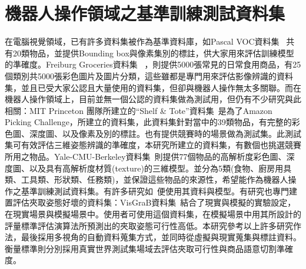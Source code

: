 \section{機器人操作領域之基準訓練測試資料集}
在電腦視覺領域，已有許多資料集被作為基準資料庫，如Pascal VOC資料集 ~\cite{everingham2010pascal}共有20類物品，並提供Bounding box與像素集別的標註，供大家用來評估訓練模型的準確度。Freiburg Groceries資料集 ~\cite{jund2016freiburg}，則提供5000張常見的日常食用商品，有25個類別共5000張彩色圖片及圖片分類，這些雖都是專門用來評估影像辨識的資料集，並且已受大家公認且大量使用的資料集，但卻與機器人操作無太多關聯。而在機器人操作領域上，目前並無一個公認的資料集做為測試用，但仍有不少研究與此相關：MIT Princeton 團隊所建立的``Shelf \& Tote''資料集~\cite{zeng2016multi}是為了Amazon Picking Challenge，所建立的資料集，此資料集針對當中的39類物品，有完整的彩色圖、深度圖、以及像素及別的標註。也有提供競賽時的場景做為測試集。此測試集可有效評估三維姿態辨識的準確度，本研究所建立的資料集，有數個也挑選競賽所用之物品。Yale-CMU-Berkeley資料集~\cite{calli2015benchmarking}則提供77個物品的高解析度彩色圖、深度圖、以及具有高解析度材質(texture)的三維模型。並分為5類(食物、廚房用具類、工具類、形狀類、任務類)，並保證這些物品的來源性，希望能作為機器人操作之基準訓練測試資料集。有許多研究如~\cite{mahler2016dex}便使用其資料與模型。有研究也專門建置評估夾取姿態好壞的資料集：VisGraB資料集~\cite{kootstra2012visgrab}結合了現實與模擬的實驗設定，在現實場景與模擬場景中。使用者可使用這個資料集，在模擬場景中用其所設計的評量標準評估演算法所預測出的夾取姿態可行性高低。本研究參考以上許多研究作法，最後採用多視角的自動資料蒐集方式，並同時從虛擬與現實蒐集與標註資料。衡量標準則分別採用真實世界測試集場域去評估夾取可行性與商品語意切割準確度。


